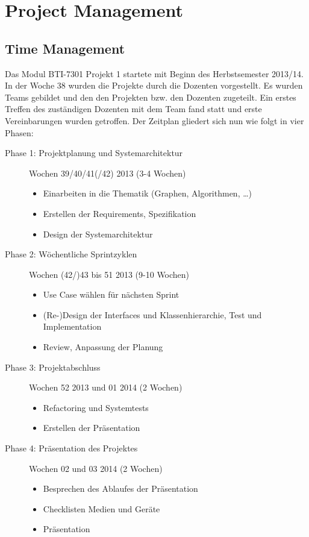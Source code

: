 \chapter{Project Management}
% 
\section{Time Management}
\label{sec:Time Management}
Das Modul BTI-7301 Projekt 1 startete mit Beginn des Herbstsemester 2013/14. In der Woche 38 wurden die Projekte durch die Dozenten vorgestellt. Es wurden Teams gebildet und den den Projekten bzw. den Dozenten zugeteilt. Ein erstes Treffen des zust\"andigen Dozenten mit dem Team fand statt und erste Vereinbarungen wurden getroffen. Der Zeitplan gliedert sich nun wie folgt in vier Phasen:
\begin{description}
  \item[Phase 1: Projektplanung und Systemarchitektur] Wochen 39/40/41(/42) 2013 (3-4 Wochen)
  \begin{itemize}
    \item Einarbeiten in die Thematik (Graphen, Algorithmen, \dots)
    \item Erstellen der Requirements, Spezifikation
    \item Design der Systemarchitektur
  \end{itemize}
  \item[Phase 2: W\"ochentliche Sprintzyklen] Wochen (42/)43 bis 51 2013 (9-10 Wochen)
  \begin{itemize}
    \item Use Case w\"ahlen f\"ur n\"achsten Sprint
    \item (Re-)Design der Interfaces und Klassenhierarchie, Test und Implementation
    \item Review, Anpassung der Planung
  \end{itemize}
  \item[Phase 3: Projektabschluss] Wochen 52 2013 und 01 2014 (2 Wochen)
  \begin{itemize}
    \item Refactoring und Systemtests
    \item Erstellen der Pr\"asentation
  \end{itemize}
  \item[Phase 4: Pr\"asentation des Projektes] Wochen 02 und 03 2014 (2 Wochen)
  \begin{itemize}
    \item Besprechen des Ablaufes der Pr\"asentation
    \item Checklisten Medien und Ger\"ate
    \item Pr\"asentation
  \end{itemize}
\end{description}
% 
